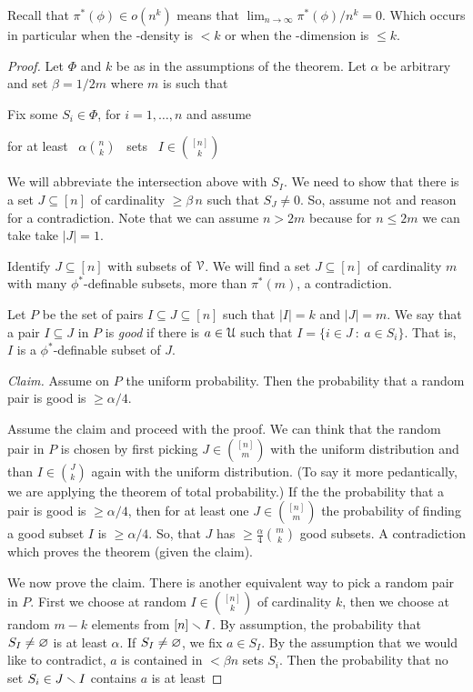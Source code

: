 \documentclass[sputnik.tex]{subfiles}
\begin{document}
Recall that $\pi^*(\phi)\in o(n^k)$ means that $\lim_{n\to\infty}\pi^*(\phi)/n^k=0$.
Which occurs in particular when the \vc-density is $<k$ or when the \vc-dimension is $\le k$.
\begin{proof}
Let $\Phi$ and $k$ be as in the assumptions of the theorem.
Let $\alpha$ be arbitrary and set $\beta=1/2m$ where $m$ is such that 


Fix some  $S_i\in\Phi$, for $i=1,\dots,n$ and assume
 
\quad for at least \ $\displaystyle\alpha{n\choose k}$ \ sets \ $\displaystyle I\in{[n]\choose k}$

We will abbreviate the intersection above with $S_I$.
We need to show that there is a set $J\subseteq [n]$ of cardinality $\ge\beta\,n$ such that $S_J\neq0$.
So, assume not and reason for a contradiction.
Note that we can assume $n>2m$ because for $n\le2m$ we can take take $|J|=1$.

Identify $J\subseteq[n]$ with subsets of $\EuScript V$.
We will find a set $J\subseteq[n]$ of cardinality $m$ with many $\phi^*$-definable subsets, more than $\pi^*(m)$, a contradiction.

Let $P$ be the set of pairs $I\subseteq J\subseteq[n]$ such that $|I|=k$ and $|J|=m$.
We say that a pair $I\subseteq J$ in $P$ is \textit{good\/} if there is $a\in\EuScript U$ such that $I=\{i\in J\ :\ a\in S_i\}$.
That is, $I$ is a $\phi^*$-definable subset of $J$.

\textit{Claim.} Assume on $P$ the uniform probability.
Then the probability that a random pair is good is $\ge\alpha/4$.

Assume the claim and proceed with the proof.
We can think that the random pair in $P$ is chosen by first picking $J\in{[n]\choose m}$ with the uniform distribution and than $I\in{J\choose k}$ again with the uniform distribution. 
(To say it more pedantically, we are applying the theorem of total probability.)
If the the probability that a pair is good is $\ge\alpha/4$, then for at least one $J\in{[n]\choose m}$ the probability of finding a good subset $I$ is $\ge\alpha/4$.
So, that $J$ has $\ge\frac\alpha4{m\choose k}$ good subsets.
A contradiction which proves the theorem (given the claim).

We now prove the claim.
There is another equivalent way to pick a random pair in $P$.
First we choose at random $I\in{[n]\choose k}$ of cardinality $k$, then we choose at random $m-k$ elements from $[n]\smallsetminus I$.
By assumption, the probability that $S_I\neq\varnothing$ is at least $\alpha$. If  $S_I\neq\varnothing$, we fix $a\in S_I$.
By the assumption that we would like to contradict, $a$ is contained in $<\beta n$ sets $S_i$.
Then the probability that no set $S_i\in J\smallsetminus I$ contains $a$ is at least


\end{proof}
\end{document}
